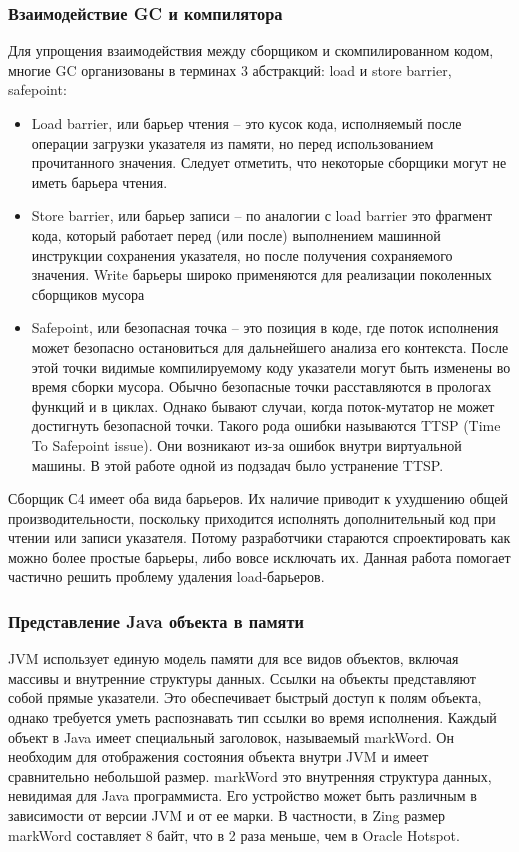 \subsubsection{Взаимодействие GC и компилятора}
Для упрощения взаимодействия между сборщиком и скомпилированном кодом, многие GC организованы в терминах 3 абстракций: load и store barrier, safepoint\cite{gc-llvm}:
\begin{itemize}
	\item Load barrier, или барьер чтения – это кусок кода, исполняемый после операции загрузки указателя из памяти, но перед использованием прочитанного значения. Следует отметить, что некоторые сборщики могут не иметь барьера чтения.
	\item Store barrier, или барьер записи  – по аналогии с load barrier это фрагмент кода, который работает перед (или после) выполнением машинной инструкции сохранения указателя, но после получения сохраняемого значения.
	Write барьеры широко применяются для реализации поколенных сборщиков мусора
	\item Safepoint, или безопасная точка – это позиция в коде, где поток исполнения может безопасно остановиться для дальнейшего анализа его контекста. После этой точки видимые компилируемому коду указатели могут быть изменены во время сборки мусора\cite{gc-handbook}. 
	Обычно безопасные точки расставляются в прологах функций и в циклах. Однако бывают случаи, когда поток-мутатор не может достигнуть безопасной точки. Такого рода ошибки называются TTSP (Time To Safepoint issue). 
	Они возникают из-за ошибок внутри виртуальной машины. В этой работе одной из подзадач было устранение TTSP.
\end{itemize}
Сборщик С4 имеет оба вида барьеров. Их наличие приводит к ухудшению общей производительности, поскольку приходится исполнять дополнительный код при чтении или записи указателя. 
Потому разработчики стараются спроектировать как можно более простые барьеры, либо вовсе исключать их. 
Данная работа помогает частично решить проблему удаления load-барьеров.

\subsubsection{Представление Java объекта в памяти}
JVM использует единую модель памяти для все видов объектов, включая массивы и внутренние структуры данных. 
Ссылки на объекты представляют собой прямые указатели. Это обеспечивает быстрый доступ к полям объекта, однако требуется уметь распознавать тип ссылки во время исполнения. 
Каждый объект в Java имеет специальный заголовок, называемый markWord. Он необходим для отображения состояния объекта внутри JVM и имеет сравнительно небольшой размер. 
markWord это внутренняя структура данных, невидимая для Java программиста. Его устройство может быть различным в зависимости от версии JVM и от ее марки. 
В частности, в Zing размер markWord составляет 8 байт, что в 2 раза меньше, чем в Oracle Hotspot. 

